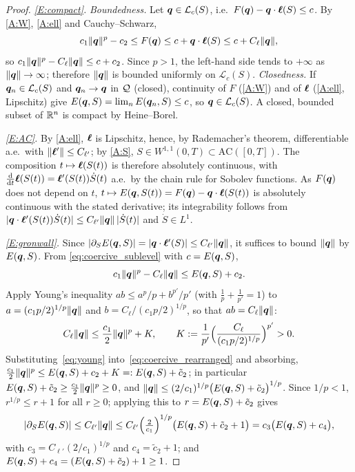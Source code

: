 \begin{proof}
\emph{\ref{E:compact}.} \textit{Boundedness.} Let
$\bm{q}\in\mathcal L_c(S)$, i.e.\ $F(\bm{q})-\bm{q}\cdot\bm{\ell}(S)\le c$.
By \ref{A:W}, \ref{A:ell} and Cauchy--Schwarz,
\begin{equation}\label{eq:coercive_sublevel}
  c_1\|\bm{q}\|^p-c_2\le F(\bm{q})\le c+\bm{q}\cdot\bm{\ell}(S)\le c+C_\ell\|\bm{q}\|,
\end{equation}
so $c_1\|\bm{q}\|^p-C_\ell\|\bm{q}\|\le c+c_2$. Since $p>1$, the
left-hand side tends to $+\infty$ as $\|\bm{q}\|\to\infty$; therefore
$\|\bm{q}\|$ is bounded uniformly on $\mathcal L_c(S)$. \textit{Closedness.}
If $\bm{q}_n\in\mathcal L_c(S)$ and $\bm{q}_n\to\bm{q}$ in $\mathcal{Q}$ (closed),
continuity of $F$ (\ref{A:W}) and of $\bm{\ell}$ (\ref{A:ell}, Lipschitz)
give $E(\bm{q},S)=\lim_n E(\bm{q}_n,S)\le c$, so $\bm{q}\in\mathcal L_c(S)$.
A closed, bounded subset of $\mathbb{R}^n$ is compact by Heine--Borel.

\emph{\ref{E:AC}.} By \ref{A:ell}, $\bm{\ell}$ is Lipschitz, hence, by
Rademacher's theorem, differentiable a.e.\ with $\|\bm{\ell}'\|\le C_{\ell'}$;
by \ref{A:S}, $S\in W^{1,1}(0,T)\subset\mathrm{AC}([0,T])$. The
composition $t\mapsto\bm{\ell}(S(t))$ is therefore absolutely continuous,
with $\frac{\mathop{}\!\mathrm{d}}{\mathop{}\!\mathrm{d} t}\bm{\ell}(S(t))=\bm{\ell}'(S(t))\dot S(t)$ a.e.\ by the
chain rule for Sobolev functions. As $F(\bm{q})$ does not depend on $t$,
$t\mapsto E(\bm{q},S(t))=F(\bm{q})-\bm{q}\cdot\bm{\ell}(S(t))$ is absolutely
continuous with the stated derivative; its integrability follows from
$|\bm{q}\cdot\bm{\ell}'(S(t))\dot S(t)|\le C_{\ell'}\|\bm{q}\|\,|\dot S(t)|$
and $\dot S\in L^1$.

\emph{\ref{E:gronwall}.} Since $|\partial_S E(\bm{q},S)|=|\bm{q}\cdot\bm{\ell}'(S)|\le C_{\ell'}\|\bm{q}\|$,
it suffices to bound $\|\bm{q}\|$ by $E(\bm{q},S)$. From
\eqref{eq:coercive_sublevel} with $c=E(\bm{q},S)$,
\begin{equation}\label{eq:coercive_rearranged}
  c_1\|\bm{q}\|^p-C_\ell\|\bm{q}\|\le E(\bm{q},S)+c_2 .
\end{equation}
Apply Young's inequality $ab\le a^p/p+b^{p'}/p'$ (with
$\tfrac1p+\tfrac1{p'}=1$) to
$a=(c_1p/2)^{1/p}\|\bm{q}\|$ and $b=C_\ell/(c_1p/2)^{1/p}$, so that
$ab=C_\ell\|\bm{q}\|$:
\begin{equation}\label{eq:young}
  C_\ell\|\bm{q}\|\le\frac{c_1}{2}\|\bm{q}\|^p+K,
  \qquad K:=\frac{1}{p'}\Bigl(\frac{C_\ell}{(c_1p/2)^{1/p}}\Bigr)^{p'}>0 .
\end{equation}
Substituting~\eqref{eq:young} into~\eqref{eq:coercive_rearranged} and
absorbing,
$\tfrac{c_1}{2}\|\bm{q}\|^p\le E(\bm{q},S)+c_2+K=:E(\bm{q},S)+\tilde c_2$;
in particular $E(\bm{q},S)+\tilde c_2\ge\tfrac{c_1}{2}\|\bm{q}\|^p\ge0$,
and
$\|\bm{q}\|\le(2/c_1)^{1/p}\bigl(E(\bm{q},S)+\tilde c_2\bigr)^{1/p}$.
Since $1/p<1$, $r^{1/p}\le r+1$ for all $r\ge0$; applying this to
$r=E(\bm{q},S)+\tilde c_2$ gives
\[
  |\partial_S E(\bm{q},S)|\le C_{\ell'}\|\bm{q}\|
  \le C_{\ell'}\Bigl(\tfrac{2}{c_1}\Bigr)^{1/p}\bigl(E(\bm{q},S)+\tilde c_2+1\bigr)
  = c_3\bigl(E(\bm{q},S)+c_4\bigr),
\]
with $c_3=C_{\ell'}(2/c_1)^{1/p}$ and $c_4=\tilde c_2+1$; and
$E(\bm{q},S)+c_4=(E(\bm{q},S)+\tilde c_2)+1\ge1$.
\end{proof}

